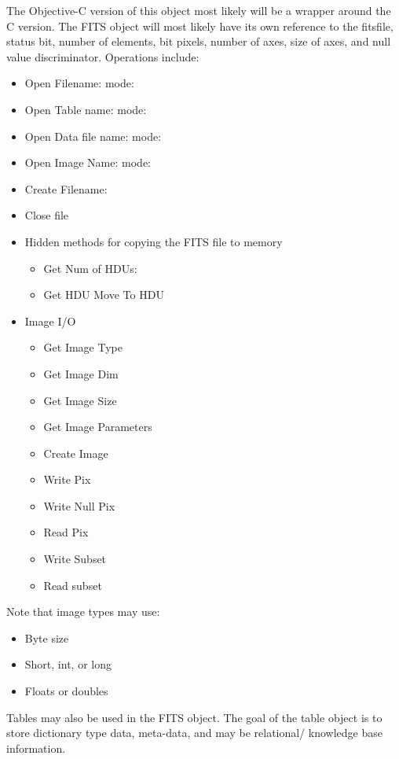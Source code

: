 \documentclass[11pt]{article}
\begin{document}
The Objective-C version of this object most likely will be a wrapper around the C version.  The FITS object will most likely have its own reference to the fitsfile, status bit, number of elements, bit pixels, number of axes, size of axes, and null value discriminator.  Operations include:
\begin{itemize}
\item Open Filename: mode: 
\item Open Table name: mode:
\item Open Data file name:  mode:
\item Open Image Name:  mode:
\item Create Filename: 
\item Close file
\item Hidden methods for copying the FITS file to memory
\begin{itemize}
\item Get Num of HDUs:
\item Get HDU Move To HDU
\end{itemize}
\item Image I/O 
\begin{itemize}
\item Get Image Type
\item Get Image Dim
\item Get Image Size
\item Get Image Parameters
\item Create Image
\item Write Pix
\item Write Null Pix
\item Read Pix
\item Write Subset
\item Read subset
\end{itemize}

\end{itemize}


Note that image types may use:
\begin{itemize}
\item Byte size 
\item Short, int, or long
\item Floats or doubles
\end{itemize}

 Tables may also be used in the FITS object.  The goal of the table object is to store dictionary type data, meta-data, and may be relational/ knowledge base information.  
 
 
\end{document}
